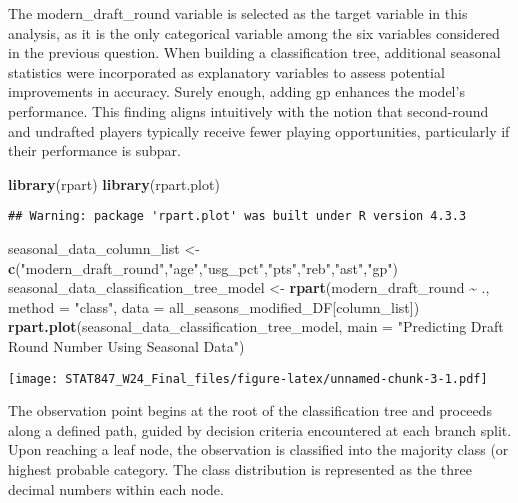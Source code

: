 \documentclass[
]{article}
\newenvironment{Shaded}{\begin{snugshade}}{\end{snugshade}}
\newcommand{\AttributeTok}[1]{\textcolor[rgb]{0.13,0.29,0.53}{#1}}
\newcommand{\FunctionTok}[1]{\textcolor[rgb]{0.13,0.29,0.53}{\textbf{#1}}}
\newcommand{\NormalTok}[1]{#1}
\newcommand{\OtherTok}[1]{\textcolor[rgb]{0.56,0.35,0.01}{#1}}
\newcommand{\SpecialCharTok}[1]{\textcolor[rgb]{0.81,0.36,0.00}{\textbf{#1}}}
\newcommand{\StringTok}[1]{\textcolor[rgb]{0.31,0.60,0.02}{#1}}
\begin{document}
The modern\_draft\_round variable is selected as the target variable in
this analysis, as it is the only categorical variable among the six
variables considered in the previous question. When building a
classification tree, additional seasonal statistics were incorporated as
explanatory variables to assess potential improvements in accuracy.
Surely enough, adding gp enhances the model's performance. This finding
aligns intuitively with the notion that second-round and undrafted
players typically receive fewer playing opportunities, particularly if
their performance is subpar.

\begin{Shaded}
\begin{Highlighting}[]
\FunctionTok{library}\NormalTok{(rpart)}
\FunctionTok{library}\NormalTok{(rpart.plot)}
\end{Highlighting}
\end{Shaded}

\begin{verbatim}
## Warning: package 'rpart.plot' was built under R version 4.3.3
\end{verbatim}

\begin{Shaded}
\begin{Highlighting}[]
\NormalTok{seasonal\_data\_column\_list }\OtherTok{\textless{}{-}} \FunctionTok{c}\NormalTok{(}\StringTok{"modern\_draft\_round"}\NormalTok{,}\StringTok{"age"}\NormalTok{,}\StringTok{"usg\_pct"}\NormalTok{,}\StringTok{"pts"}\NormalTok{,}\StringTok{"reb"}\NormalTok{,}\StringTok{"ast"}\NormalTok{,}\StringTok{"gp"}\NormalTok{)}
\NormalTok{seasonal\_data\_classification\_tree\_model }\OtherTok{\textless{}{-}} \FunctionTok{rpart}\NormalTok{(modern\_draft\_round }\SpecialCharTok{\textasciitilde{}}\NormalTok{ ., }\AttributeTok{method =} \StringTok{"class"}\NormalTok{, }
                                   \AttributeTok{data =}\NormalTok{ all\_seasons\_modified\_DF[column\_list])}
\FunctionTok{rpart.plot}\NormalTok{(seasonal\_data\_classification\_tree\_model, }
           \AttributeTok{main =} \StringTok{"Predicting Draft Round Number Using Seasonal Data"}\NormalTok{)}
\end{Highlighting}
\end{Shaded}

\texttt{[image: STAT847\_W24\_Final\_files/figure-latex/unnamed-chunk-3-1.pdf]}

The observation point begins at the root of the classification tree and
proceeds along a defined path, guided by decision criteria encountered
at each branch split. Upon reaching a leaf node, the observation is
classified into the majority class (or highest probable category. The
class distribution is represented as the three decimal numbers within
each node.
\end{document}
